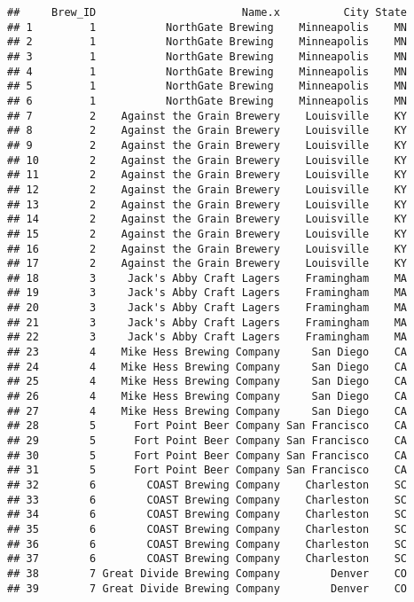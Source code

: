 \documentclass[
]{article}
\begin{document}
\begin{verbatim}
##     Brew_ID                       Name.x          City State
## 1         1           NorthGate Brewing    Minneapolis    MN
## 2         1           NorthGate Brewing    Minneapolis    MN
## 3         1           NorthGate Brewing    Minneapolis    MN
## 4         1           NorthGate Brewing    Minneapolis    MN
## 5         1           NorthGate Brewing    Minneapolis    MN
## 6         1           NorthGate Brewing    Minneapolis    MN
## 7         2    Against the Grain Brewery    Louisville    KY
## 8         2    Against the Grain Brewery    Louisville    KY
## 9         2    Against the Grain Brewery    Louisville    KY
## 10        2    Against the Grain Brewery    Louisville    KY
## 11        2    Against the Grain Brewery    Louisville    KY
## 12        2    Against the Grain Brewery    Louisville    KY
## 13        2    Against the Grain Brewery    Louisville    KY
## 14        2    Against the Grain Brewery    Louisville    KY
## 15        2    Against the Grain Brewery    Louisville    KY
## 16        2    Against the Grain Brewery    Louisville    KY
## 17        2    Against the Grain Brewery    Louisville    KY
## 18        3     Jack's Abby Craft Lagers    Framingham    MA
## 19        3     Jack's Abby Craft Lagers    Framingham    MA
## 20        3     Jack's Abby Craft Lagers    Framingham    MA
## 21        3     Jack's Abby Craft Lagers    Framingham    MA
## 22        3     Jack's Abby Craft Lagers    Framingham    MA
## 23        4    Mike Hess Brewing Company     San Diego    CA
## 24        4    Mike Hess Brewing Company     San Diego    CA
## 25        4    Mike Hess Brewing Company     San Diego    CA
## 26        4    Mike Hess Brewing Company     San Diego    CA
## 27        4    Mike Hess Brewing Company     San Diego    CA
## 28        5      Fort Point Beer Company San Francisco    CA
## 29        5      Fort Point Beer Company San Francisco    CA
## 30        5      Fort Point Beer Company San Francisco    CA
## 31        5      Fort Point Beer Company San Francisco    CA
## 32        6        COAST Brewing Company    Charleston    SC
## 33        6        COAST Brewing Company    Charleston    SC
## 34        6        COAST Brewing Company    Charleston    SC
## 35        6        COAST Brewing Company    Charleston    SC
## 36        6        COAST Brewing Company    Charleston    SC
## 37        6        COAST Brewing Company    Charleston    SC
## 38        7 Great Divide Brewing Company        Denver    CO
## 39        7 Great Divide Brewing Company        Denver    CO

\end{verbatim}
\end{document}
